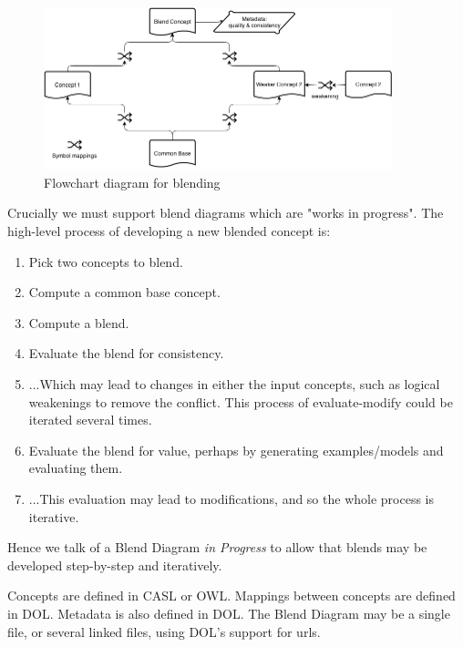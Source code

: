 \documentclass[10pt]{article}
\begin{document}
\begin{figure}[!ht]
\includegraphics[width=0.9\textwidth]{BlendDiagram.png}
\caption{Flowchart diagram for blending}
\label{fig:flowchart}
\end{figure}

Crucially we must support blend diagrams which are "works in progress". The high-level process of developing a new blended concept is:
\begin{enumerate}
\item Pick two concepts to blend.
\item Compute a common base concept.
\item Compute a blend.
\item Evaluate the blend for consistency.
\item ...Which may lead to changes in either the input concepts, such as logical weakenings to remove the conflict. This process of evaluate-modify could be iterated several times.
\item Evaluate the blend for value, perhaps by generating examples/models and evaluating them.
\item ...This evaluation may lead to modifications, and so the whole process is iterative.
\end{enumerate}
Hence we talk of a Blend Diagram {\em in Progress} to allow that blends may be developed step-by-step and iteratively.

Concepts are defined in CASL or OWL. Mappings between concepts are defined in DOL. Metadata is also defined in DOL. The Blend Diagram may be a single file, or several linked files, using DOL's support for urls.
\end{document}
